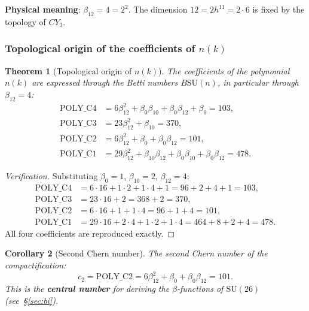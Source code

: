 \documentclass[11pt,a4paper]{article}
\newcommand{\SU}{\ensuremath{\mathrm{SU}}}
\newcommand{\CY}{\ensuremath{CY_3}}
\newcommand{\cTwo}{\ensuremath{c_2}}
\newtheorem{theorem}{Theorem}[section]
\newtheorem{corollary}[theorem]{Corollary}
\theoremstyle{definition}
\begin{document}
\medskip\noindent
\textbf{Physical meaning}: $\beta_{12} = 4 = 2^2$. The dimension
$12 = 2 h^{11} = 2 \cdot 6$ is fixed by the topology of $\CY$.

\subsubsection{Topological origin of the coefficients of \texorpdfstring{$n(k)$}{n(k)}}
\label{subsec:betti-coeffs}

\begin{theorem}[Topological origin of $n(k)$]
\label{thm:master-poly-topology}
The coefficients of the polynomial $n(k)$ are expressed through the
Betti numbers $B\SU(n)$, in particular through $\beta_{12} = 4$:
\begin{align}
    \text{POLY\_C4} &= 6 \beta_{12}^2 + \beta_0 \beta_{10}
                      + \beta_0 \beta_{12} + \beta_0 = 103,
    \label{eq:poly-c4} \\
    \text{POLY\_C3} &= 23 \beta_{12}^2 + \beta_{10} = 370,
    \label{eq:poly-c3} \\
    \text{POLY\_C2} &= 6 \beta_{12}^2 + \beta_0 + \beta_0 \beta_{12} = 101,
    \label{eq:poly-c2} \\
    \text{POLY\_C1} &= 29 \beta_{12}^2 + \beta_{10} \beta_{12}
                      + \beta_0 \beta_{10} + \beta_0 \beta_{12} = 478.
    \label{eq:poly-c1}
\end{align}
\end{theorem}

\begin{proof}[Verification]
Substituting $\beta_0 = 1$, $\beta_{10} = 2$, $\beta_{12} = 4$:
\begin{align}
    \text{POLY\_C4} &= 6 \cdot 16 + 1 \cdot 2 + 1 \cdot 4 + 1
                      = 96 + 2 + 4 + 1 = 103, \\
    \text{POLY\_C3} &= 23 \cdot 16 + 2 = 368 + 2 = 370, \\
    \text{POLY\_C2} &= 6 \cdot 16 + 1 + 1 \cdot 4 = 96 + 1 + 4 = 101, \\
    \text{POLY\_C1} &= 29 \cdot 16 + 2 \cdot 4 + 1 \cdot 2 + 1 \cdot 4
                      = 464 + 8 + 2 + 4 = 478.
\end{align}
All four coefficients are reproduced exactly.
\end{proof}

\begin{corollary}[Second Chern number]
\label{cor:c2}
The second Chern number of the compactification:
\begin{equation}
    \boxed{
    \cTwo = \text{POLY\_C2} = 6 \beta_{12}^2 + \beta_0 + \beta_0 \beta_{12} = 101.
    }
    \label{eq:c2}
\end{equation}
This is the \textbf{central number} for deriving the $\beta$-functions of $\SU(26)$
(see~\S\ref{sec:bi}).
\end{corollary}
\end{document}
